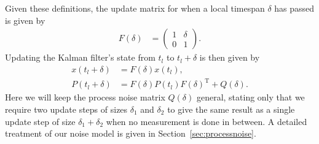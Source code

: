 \documentclass{article}
\begin{document}
Given these definitions, the update matrix for when a local timespan $\delta$ has passed is given by
\begin{align}
F(\delta) &= \begin{pmatrix}
1 & \delta\\
0 & 1
\end{pmatrix}.
\end{align}
Updating the Kalman filter's state from $t_l$ to $t_l+\delta$ is then given by
\begin{align}
x(t_l+\delta) &= F(\delta)x(t_l),\\
P(t_l+\delta) &= F(\delta)P(t_l)F(\delta)^\mathrm{T} + Q(\delta).
\end{align}
Here we will keep the process noise matrix $Q(\delta)$ general, stating only that we require two update steps of sizes $\delta_1$ and $\delta_2$
to give the same result as a single update step of size $\delta_1 + \delta_2$ when no measurement is done in between.
A detailed treatment of our noise model is given in Section~\ref{sec:processnoise}.
\end{document}
